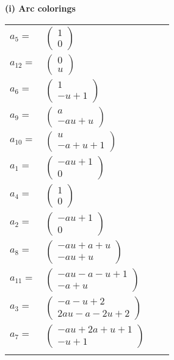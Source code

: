 \documentclass[1p]{elsarticle_modified}
\theoremstyle{definition}
\begin{document}
\flushleft \textbf{(i) Arc colorings}\\
\begin{tabular}{m{7pt} m{180pt} m{7pt} m{180pt} }
\flushright $a_{5}=$&$\begin{pmatrix}1\\0\end{pmatrix}$ \\
\flushright $a_{12}=$&$\begin{pmatrix}0\\u\end{pmatrix}$ \\
\flushright $a_{6}=$&$\begin{pmatrix}1\\- u+1\end{pmatrix}$ \\
\flushright $a_{9}=$&$\begin{pmatrix}a\\- a u+u\end{pmatrix}$ \\
\flushright $a_{10}=$&$\begin{pmatrix}u\\- a+u+1\end{pmatrix}$ \\
\flushright $a_{1}=$&$\begin{pmatrix}- a u+1\\0\end{pmatrix}$ \\
\flushright $a_{4}=$&$\begin{pmatrix}1\\0\end{pmatrix}$ \\
\flushright $a_{2}=$&$\begin{pmatrix}- a u+1\\0\end{pmatrix}$ \\
\flushright $a_{8}=$&$\begin{pmatrix}- a u+a+u\\- a u+u\end{pmatrix}$ \\
\flushright $a_{11}=$&$\begin{pmatrix}- a u- a- u+1\\- a+u\end{pmatrix}$ \\
\flushright $a_{3}=$&$\begin{pmatrix}- a- u+2\\2 a u- a-2 u+2\end{pmatrix}$ \\
\flushright $a_{7}=$&$\begin{pmatrix}- a u+2 a+u+1\\- u+1\end{pmatrix}$\\&\end{tabular}
\end{document}
